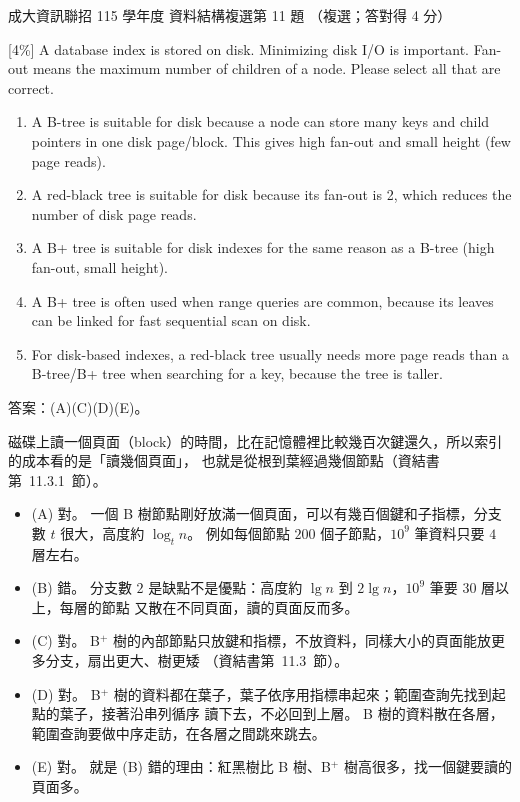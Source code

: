 \begin{pastexam}[label={px:ncku-115-prog-08}]{成大資訊聯招 115 學年度 資料結構複選第 11 題}
（複選；答對得 4 分）

[4\%] A database index is stored on disk. Minimizing disk I/O is important. Fan-out means the maximum
number of children of a node. Please select all that are correct.
\begin{enumerate}[label=(\Alph*),nosep]
\item A B-tree is suitable for disk because a node can store many keys and child pointers in one disk
page/block. This gives high fan-out and small height (few page reads).
\item A red-black tree is suitable for disk because its fan-out is 2, which reduces the number of disk
page reads.
\item A B+ tree is suitable for disk indexes for the same reason as a B-tree (high fan-out, small height).
\item A B+ tree is often used when range queries are common, because its leaves can be linked for fast
sequential scan on disk.
\item For disk-based indexes, a red-black tree usually needs more page reads than a B-tree/B+ tree when
searching for a key, because the tree is taller.
\end{enumerate}
\end{pastexam}

\begin{pastsoln}
答案：(A)(C)(D)(E)。

磁碟上讀一個頁面（block）的時間，比在記憶體裡比較幾百次鍵還久，所以索引的成本看的是「讀幾個頁面」，
也就是從根到葉經過幾個節點（資結書第~11.3.1~節）。
\begin{itemize}
\item (A) 對。 一個 B 樹節點剛好放滿一個頁面，可以有幾百個鍵和子指標，分支數 $t$ 很大，高度約
$\log_t n$。 例如每個節點 $200$ 個子節點，$10^9$ 筆資料只要 $4$ 層左右。
\item (B) 錯。 分支數 $2$ 是缺點不是優點：高度約 $\lg n$ 到 $2 \lg n$，$10^9$ 筆要 $30$ 層以上，每層的節點
又散在不同頁面，讀的頁面反而多。
\item (C) 對。 B$^+$ 樹的內部節點只放鍵和指標，不放資料，同樣大小的頁面能放更多分支，扇出更大、樹更矮
（資結書第~11.3~節）。
\item (D) 對。 B$^+$ 樹的資料都在葉子，葉子依序用指標串起來；範圍查詢先找到起點的葉子，接著沿串列循序
讀下去，不必回到上層。 B 樹的資料散在各層，範圍查詢要做中序走訪，在各層之間跳來跳去。
\item (E) 對。 就是 (B) 錯的理由：紅黑樹比 B 樹、B$^+$ 樹高很多，找一個鍵要讀的頁面多。
\end{itemize}
\end{pastsoln}
